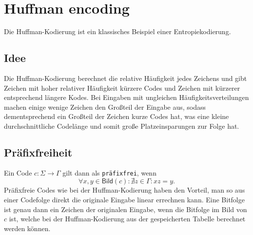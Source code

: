 \documentclass{article}
\begin{document}
\section{Huffman encoding}
Die Huffman-Kodierung ist ein klassisches Beispiel einer Entropiekodierung.
\subsection{Idee}
Die Huffman-Kodierung berechnet die relative Häufigkeit jedes Zeichens und 
gibt Zeichen mit hoher relativer Häufigkeit kürzere Codes und Zeichen mit kürzerer
entsprechend längere Kodes. Bei Eingaben mit ungleichen Häufigkeitsverteilungen machen
einige wenige Zeichen den Großteil der Eingabe aus, sodass dementsprechend ein Großteil
der Zeichen kurze Codes hat, was eine kleine durchschnittliche Codelänge und
somit große Platzeinsparungen zur Folge hat.
\subsection{Präfixfreiheit}
Ein Code $c: \Sigma \to \Gamma$ gilt dann als \texttt{präfixfrei}, wenn
\[\forall x, y \in\textsf{Bild}(c) : \nexists z \in\Gamma : xz = y.\] 
Präfixfreie Codes wie bei der Huffman-Kodierung haben den Vorteil, 
man so aus einer Codefolge direkt die 
originale Eingabe linear errechnen kann. Eine Bitfolge ist genau dann ein Zeichen 
der originalen Eingabe, wenn die Bitfolge im Bild von $c$ ist, welche bei der 
Huffman-Kodierung aus der gespeicherten Tabelle berechnet werden können.
\end{document}
